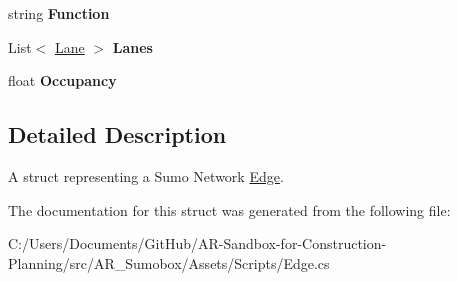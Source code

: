 \begin{DoxyCompactItemize}
\item 
\mbox{\label{struct_road_a38db85409b5fc7c8a5623ef6a6f9ba37}} 
string {\bfseries Function}
\item 
\mbox{\label{struct_road_a459591805ac1a1bb0b94930ffb3ba95e}} 
List$<$ \mbox{\hyperlink{struct_lane}{Lane}} $>$ {\bfseries Lanes}
\item 
\mbox{\label{struct_road_a46a5d14680ec4f188c60e8bc69c6228c}} 
float {\bfseries Occupancy}
\end{DoxyCompactItemize}


\subsection{Detailed Description}
A struct representing a Sumo Network \mbox{\hyperlink{class_edge}{Edge}}. 



The documentation for this struct was generated from the following file\+:\begin{DoxyCompactItemize}
\item 
C\+:/\+Users/\+Documents/\+Git\+Hub/\+A\+R-\/\+Sandbox-\/for-\/\+Construction-\/\+Planning/src/\+A\+R\+\_\+\+Sumobox/\+Assets/\+Scripts/Edge.\+cs\end{DoxyCompactItemize}
